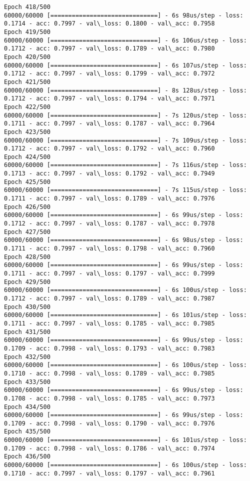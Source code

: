 \documentclass[11pt]{article}
\begin{document}
\begin{Verbatim}[commandchars=\\\{\}]
Epoch 418/500
60000/60000 [==============================] - 6s 98us/step - loss: 0.1714 - acc: 0.7997 - val\_loss: 0.1800 - val\_acc: 0.7958
Epoch 419/500
60000/60000 [==============================] - 6s 106us/step - loss: 0.1712 - acc: 0.7997 - val\_loss: 0.1789 - val\_acc: 0.7980
Epoch 420/500
60000/60000 [==============================] - 6s 107us/step - loss: 0.1712 - acc: 0.7997 - val\_loss: 0.1799 - val\_acc: 0.7972
Epoch 421/500
60000/60000 [==============================] - 8s 128us/step - loss: 0.1712 - acc: 0.7997 - val\_loss: 0.1794 - val\_acc: 0.7971
Epoch 422/500
60000/60000 [==============================] - 7s 120us/step - loss: 0.1711 - acc: 0.7997 - val\_loss: 0.1787 - val\_acc: 0.7964
Epoch 423/500
60000/60000 [==============================] - 7s 109us/step - loss: 0.1712 - acc: 0.7997 - val\_loss: 0.1792 - val\_acc: 0.7960
Epoch 424/500
60000/60000 [==============================] - 7s 116us/step - loss: 0.1713 - acc: 0.7997 - val\_loss: 0.1792 - val\_acc: 0.7949
Epoch 425/500
60000/60000 [==============================] - 7s 115us/step - loss: 0.1711 - acc: 0.7997 - val\_loss: 0.1789 - val\_acc: 0.7976
Epoch 426/500
60000/60000 [==============================] - 6s 99us/step - loss: 0.1712 - acc: 0.7997 - val\_loss: 0.1787 - val\_acc: 0.7978
Epoch 427/500
60000/60000 [==============================] - 6s 98us/step - loss: 0.1711 - acc: 0.7997 - val\_loss: 0.1798 - val\_acc: 0.7960
Epoch 428/500
60000/60000 [==============================] - 6s 99us/step - loss: 0.1711 - acc: 0.7997 - val\_loss: 0.1797 - val\_acc: 0.7999
Epoch 429/500
60000/60000 [==============================] - 6s 100us/step - loss: 0.1712 - acc: 0.7997 - val\_loss: 0.1789 - val\_acc: 0.7987
Epoch 430/500
60000/60000 [==============================] - 6s 101us/step - loss: 0.1711 - acc: 0.7997 - val\_loss: 0.1785 - val\_acc: 0.7985
Epoch 431/500
60000/60000 [==============================] - 6s 99us/step - loss: 0.1709 - acc: 0.7998 - val\_loss: 0.1793 - val\_acc: 0.7983
Epoch 432/500
60000/60000 [==============================] - 6s 100us/step - loss: 0.1710 - acc: 0.7998 - val\_loss: 0.1789 - val\_acc: 0.7985
Epoch 433/500
60000/60000 [==============================] - 6s 99us/step - loss: 0.1708 - acc: 0.7998 - val\_loss: 0.1785 - val\_acc: 0.7973
Epoch 434/500
60000/60000 [==============================] - 6s 99us/step - loss: 0.1709 - acc: 0.7998 - val\_loss: 0.1790 - val\_acc: 0.7976
Epoch 435/500
60000/60000 [==============================] - 6s 101us/step - loss: 0.1709 - acc: 0.7998 - val\_loss: 0.1786 - val\_acc: 0.7974
Epoch 436/500
60000/60000 [==============================] - 6s 100us/step - loss: 0.1710 - acc: 0.7997 - val\_loss: 0.1797 - val\_acc: 0.7961

\end{Verbatim}
\end{document}

